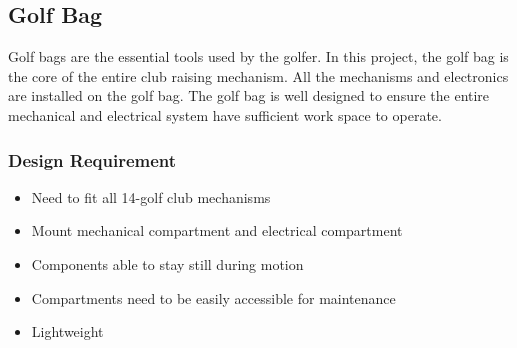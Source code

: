 \documentclass[11pt,landscape]{article}
\begin{document}
\begin{multicols}{3}
    \subsection{Golf Bag}
    Golf bags are the essential tools used by the golfer. In this project, the
    golf bag is the core of the entire club raising mechanism. All the mechanisms
    and electronics are installed on the golf bag. The golf bag is well designed
    to ensure the entire mechanical and electrical system have sufficient work
    space to operate. 
    
    \subsubsection{Design Requirement}
    \begin{itemize}
        \item Need to fit all 14-golf club mechanisms
        \item Mount mechanical compartment and electrical compartment
        \item Components able to stay still during motion
        \item Compartments need to be easily accessible for maintenance
        \item Lightweight 
    \end{itemize}
    

\end{multicols}
\end{document}

